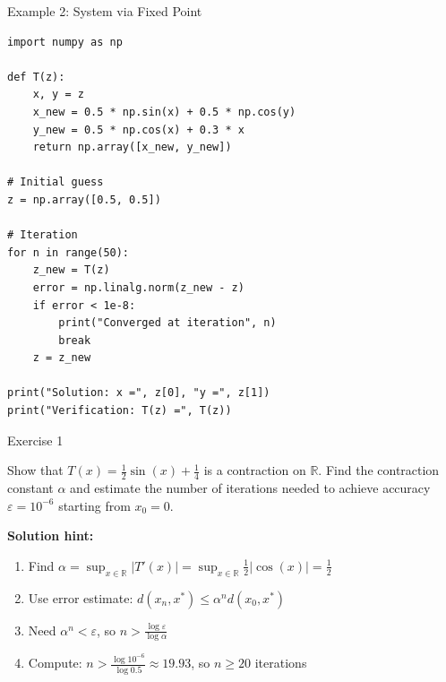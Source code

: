 \documentclass[aspectratio=169,10pt]{beamer}
\newenvironment{exercise}{\begin{definition}[Exercise]}{\end{definition}}
\begin{document}
\begin{frame}[fragile]{Example 2: System via Fixed Point}
    \begin{lstlisting}
import numpy as np

def T(z):
    x, y = z
    x_new = 0.5 * np.sin(x) + 0.5 * np.cos(y)
    y_new = 0.5 * np.cos(x) + 0.3 * x
    return np.array([x_new, y_new])

# Initial guess
z = np.array([0.5, 0.5])

# Iteration
for n in range(50):
    z_new = T(z)
    error = np.linalg.norm(z_new - z)
    if error < 1e-8:
        print("Converged at iteration", n)
        break
    z = z_new

print("Solution: x =", z[0], "y =", z[1])
print("Verification: T(z) =", T(z))
    \end{lstlisting}
\end{frame}

\begin{frame}{Exercise 1}
    \begin{exercise}
        Show that $T(x) = \frac{1}{2}\sin(x) + \frac{1}{4}$ is a contraction on $\mathbb{R}$.
        Find the contraction constant $\alpha$ and estimate the number of iterations needed to achieve
        accuracy $\varepsilon = 10^{-6}$ starting from $x_0 = 0$.
    \end{exercise}

    \vspace{0.3cm}
    \textbf{Solution hint:}
    \begin{enumerate}
        \item Find $\alpha = \sup_{x \in \mathbb{R}} |T'(x)| = \sup_{x \in \mathbb{R}} \frac{1}{2}|\cos(x)| = \frac{1}{2}$
        \item Use error estimate: $d(x_n, x^*) \leq \alpha^n d(x_0, x^*)$
        \item Need $\alpha^n < \varepsilon$, so $n > \frac{\log \varepsilon}{\log \alpha}$
        \item Compute: $n > \frac{\log 10^{-6}}{\log 0.5} \approx 19.93$, so $n \geq 20$ iterations
    \end{enumerate}
\end{frame}
\end{document}
